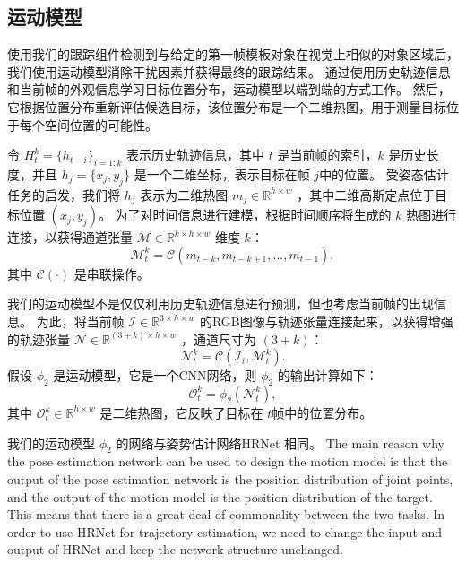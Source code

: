 \subsection{运动模型} 使用我们的跟踪组件检测到与给定的第一帧模板对象在视觉上相似的对象区域后，我们使用运动模型消除干扰因素并获得最终的跟踪结果。
通过使用历史轨迹信息和当前帧的外观信息学习目标位置分布，运动模型以端到端的方式工作。
然后，它根据位置分布重新评估候选目标，该位置分布是一个二维热图，用于测量目标位于每个空间位置的可能性。

令 $H_{t}^{k} = \{h_{t-i}\}_{i=1:k}$ 表示历史轨迹信息，其中 $t$ 是当前帧的索引，$k$ 是历史长度，并且 $h_{j} = \{x_{j}, y_{j}\}$ 是一个二维坐标，表示目标在帧 $j$中的位置。
受姿态估计任务的启发，我们将 $h_{j}$ 表示为二维热图 $m_{j} \in \mathbb R^{h \times w}$ ，其中二维高斯定点位于目标位置 $(x_{j}, y_{j})$。
为了对时间信息进行建模，根据时间顺序将生成的 $k$ 热图进行连接，以获得通道张量 $\mathcal{M} \in \mathbb{R}^{k \times h \times w}$ 维度 $k$：
\begin{equation}
    \mathcal{M}_{t}^{k} = \mathcal{C}(m_{t-k}, m_{t-k+1}, ..., m_{t-1}),
\end{equation}
其中 $\mathcal{C}(\cdot)$ 是串联操作。

我们的运动模型不是仅仅利用历史轨迹信息进行预测，但也考虑当前帧的出现信息。
为此，将当前帧 $\mathcal{I} \in \mathbb{R}^{3 \times h \times w}$ 的RGB图像与轨迹张量连接起来，以获得增强的轨迹张量 $\mathcal{N} \in \mathbb{R}^{(3+k) \times h \times w}$ ，通道尺寸为 $(3+k)$：
\begin{equation}
    \mathcal{N}_{t}^{k} = \mathcal{C}(\mathcal{I}_{t}, \mathcal{M}_{t}^{k}).
\end{equation}
假设 $\phi_{2}$ 是运动模型，它是一个CNN网络，则 $\phi_{2}$ 的输出计算如下：
\begin{equation}
    \mathcal{O}_{t}^{k} = \phi_{2}(\mathcal{N}_{t}^{k}),
\end{equation}
其中 $\mathcal{O}_{t}^{k} \in \mathbb{R}^{h \times w}$ 是二维热图，它反映了目标在 $t$帧中的位置分布。

我们的运动模型 $\phi_{2}$ 的网络与姿势估计网络HRNet \cite{sun2019deep}相同。
\iffalse
The main reason why the pose estimation network can be used to design the motion model is that the output of the pose estimation network is the position distribution of joint points, and the output of the motion model is the position distribution of the target. This means that there is a great deal of commonality between the two tasks. In order to use HRNet for trajectory estimation, we need to change the input and output of HRNet and keep the network structure unchanged.

